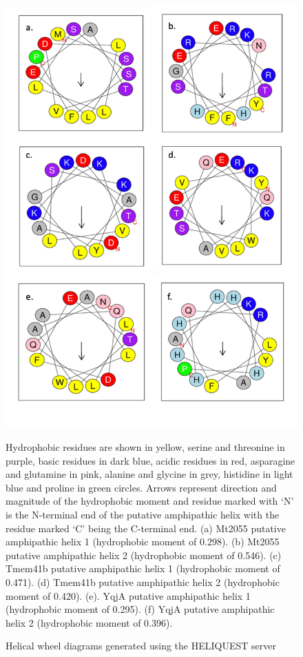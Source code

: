\begin{figure}[th!]
    \centering
    \includegraphics[width=125mm, scale =0.5]{Results/fig5.png}
    \caption{Helical wheel diagrams generated using the HELIQUEST server}
    \label{fig:heliquest}
    \small
    Hydrophobic residues are shown in yellow, serine and threonine in purple, basic residues in dark blue, acidic residues in red, asparagine and glutamine in pink, alanine and glycine in grey, histidine in light blue and proline in green circles. Arrows represent direction and magnitude of the hydrophobic moment and residue marked with ‘N’ is the N-terminal end of the putative amphipathic helix with the residue marked ‘C’ being the C-terminal end. (a) Mt2055 putative amphipathic helix 1 (hydrophobic moment of 0.298). (b) Mt2055 putative amphipathic helix 2 (hydrophobic moment of 0.546). (c) Tmem41b putative amphipathic helix 1 (hydrophobic moment of 0.471). (d) Tmem41b putative amphipathic helix 2 (hydrophobic moment of 0.420). (e). YqjA putative amphipathic helix 1 (hydrophobic moment of 0.295). (f) YqjA putative amphipathic helix 2 (hydrophobic moment of 0.396).
\end{figure}

